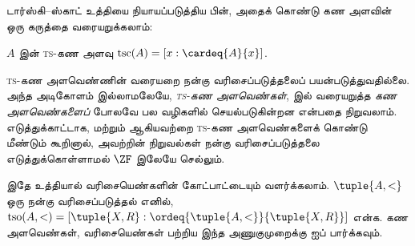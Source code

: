 \documentclass[../../../include/open-logic-section]{subfiles}
\begin{document}
டார்ஸ்கி--ஸ்காட் உத்தியை நியாயப்படுத்திய பின்,
அதைக் கொண்டு கண அளவின் ஒரு கருத்தை வரையறுக்கலாம்:

\begin{defn}
$A$ இன் \textsc{ts}-கண அளவு
$\text{tsc}(A) = [x : \cardeq{A}{x}]$.
\end{defn}

\textsc{ts}-கண அளவெண்ணின் வரையறை நன்கு வரிசைப்படுத்தலைப்
பயன்படுத்துவதில்லை. அந்த அடிகோளம் இல்லாமலேயே,
\emph{\textsc{ts}-கண அளவெண்கள்},
 இல்
வரையறுத்த \emph{கண அளவெண்களைப்} போலவே பல வழிகளில்
செயல்படுகின்றன என்பதை நிறுவலாம். எடுத்துக்காட்டாக,
 மற்றும்
ஆகியவற்றை \textsc{ts}-கண அளவெண்களைக் கொண்டு மீண்டும்
கூறினால், அவற்றின் நிறுவல்கள் நன்கு வரிசைப்படுத்தலை
எடுத்துக்கொள்ளாமல் $\ZF$ இலேயே செல்லும்.

இதே உத்தியால் வரிசையெண்களின் கோட்பாட்டையும் வளர்க்கலாம்.
$\tuple{A, <}$ ஒரு நன்கு வரிசைப்படுத்தல் எனில்,
$\text{tso}(A, <) = [\tuple{X, R} :
\ordeq{\tuple{A, <}}{\tuple{X, R}}]$ என்க. கண அளவெண்கள்,
வரிசையெண்கள் பற்றிய இந்த அணுகுமுறைக்கு
\citet[chs.~9--12]{Potter2004} ஐப் பார்க்கவும்.
\end{document}
